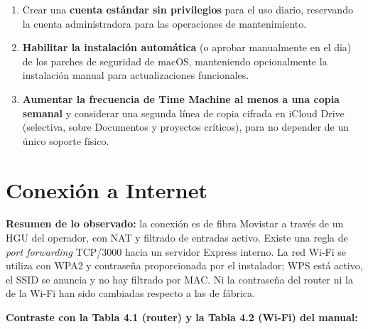 \begin{enumerate}[leftmargin=*]
    \item Crear una \textbf{cuenta estándar sin privilegios} para el uso diario, reservando la cuenta administradora para las operaciones de mantenimiento.
    \item \textbf{Habilitar la instalación automática} (o aprobar manualmente en el día) de los parches de seguridad de macOS, manteniendo opcionalmente la instalación manual para actualizaciones funcionales.
    \item \textbf{Aumentar la frecuencia de Time Machine al menos a una copia semanal} y considerar una segunda línea de copia cifrada en iCloud Drive (selectiva, sobre Documentos y proyectos críticos), para no depender de un único soporte físico.
\end{enumerate}

\section{Conexión a Internet}
\label{sec:concl-internet}

\textbf{Resumen de lo observado:} la conexión es de fibra Movistar a través de un HGU del operador, con NAT y filtrado de entradas activo. Existe una regla de \textit{port forwarding} TCP/3000 hacia un servidor Express interno. La red Wi-Fi se utiliza con WPA2 y contraseña proporcionada por el instalador; WPS está activo, el SSID se anuncia y no hay filtrado por MAC. Ni la contraseña del router ni la de la Wi-Fi han sido cambiadas respecto a las de fábrica.

\textbf{Contraste con la Tabla 4.1 (router) y la Tabla 4.2 (Wi-Fi) del manual:}


